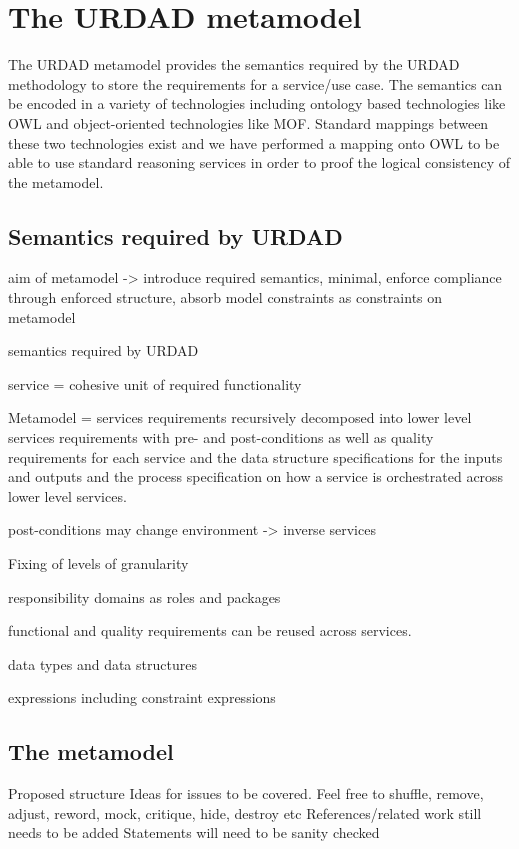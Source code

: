 \section{The URDAD metamodel \label{sec:metamodel}}

The URDAD metamodel provides the semantics required by the URDAD methodology to store the requirements for a service/use case. The semantics can be encoded in a variety of technologies including ontology based technologies like OWL and object-oriented technologies like MOF. Standard mappings between these two technologies exist \cite{} and we have performed a mapping onto OWL to be able to use standard reasoning services in order to proof the logical consistency of the metamodel.


\subsection{Semantics required by URDAD}


aim of metamodel -> introduce required semantics, minimal, enforce compliance through enforced structure, absorb model constraints as constraints on metamodel

semantics required by URDAD

service = cohesive unit of required functionality

Metamodel = services requirements recursively decomposed into lower level services requirements with pre- and post-conditions as well as quality requirements for each service and the data structure specifications for the inputs and outputs and the process specification on how a service is orchestrated across lower level services.

post-conditions may change environment -> inverse services

Fixing of levels of granularity

responsibility domains as roles and packages

functional and quality requirements can be reused across services.

data types and data structures

expressions including constraint expressions

\subsection{The metamodel}



Proposed structure
Ideas for issues to be covered.
Feel free to shuffle, remove, adjust, reword, mock, critique, hide, destroy etc
References/related work still needs to be added
Statements will need to be sanity checked


